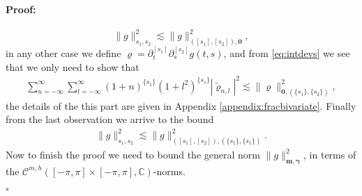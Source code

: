 \documentclass{article}
\newenvironment{proof}{\paragraph{Proof:}}{\hfill$\square$}
\newcommand{\IC}{{\mathbb C}}
\newcommand{\cmspaceh}[4]{\mathcal{C}^{#1,#2} \left( #3, #4 \right)}
\begin{document}
\begin{proof}
$$
\|g\|_{s_1,s_2}^2 \lesssim \|g\|^2_{([s_1],[s_2]),\mathbf{0}},
$$
in any other case we define $\varrho = \partial_t^{[s_1]} \partial_s^{[s_2]}g(t,s)$, and from \eqref{eq:intdevs} we see that we only need to show that 
\begin{align*}
 \sum_{n = -\infty}^\infty \sum_{l = -\infty}^\infty (1+n)^{\{s_1\}} (1+l^2)^{\{s_s\}} \left\vert\widetilde{\varrho}_{n,l}\right\vert^2 \lesssim \| \varrho \|^2_{\mathbf{0},(\{s_1\},\{s_2\})},
\end{align*}
the details of the this part are given in Appendix \ref{appendix:fracbivariate}. Finally  from the last observation we arrive to the bound
\begin{align}
\label{eq:gbound1}
\|g\|^2_{s_1,s_2} \lesssim \|g\|^2_{([s_1],[s_2]),(\{s_1\},\{s_1\})}. 
\end{align}
Now to finish the proof we need to bound the general norm $\|g\|_{\mathbf{m},\mathbf{\gamma}}^2$, in terms of the $\cmspaceh{m}{h}{[-\pi,\pi]\times[-\pi,\pi]}{\IC}$-norms.


\end{proof}
\end{document}
